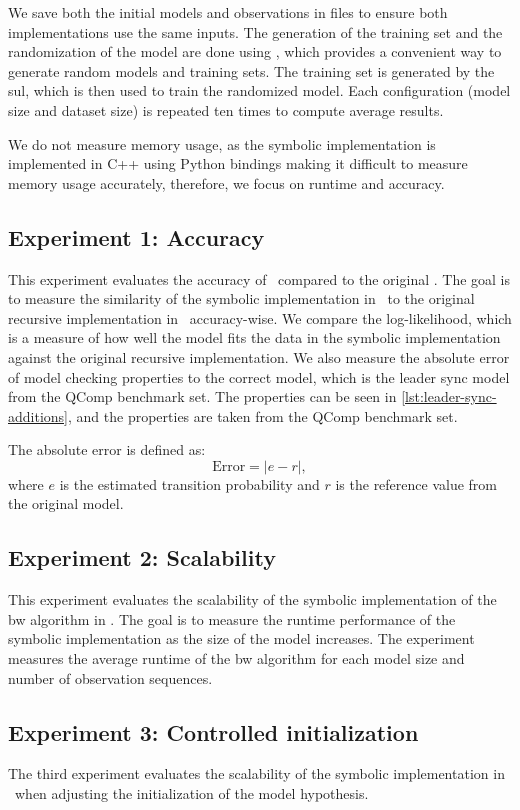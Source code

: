 We save both the initial models and observations in files to ensure both implementations use the same inputs.
The generation of the training set and the randomization of the model are done using \Jajapy, which provides a convenient way to generate random models and training sets.
The training set is generated by the \gls{sul}, which is then used to train the randomized model.
Each configuration (model size and dataset size) is repeated ten times to compute average results.

We do not measure memory usage, as the symbolic implementation is implemented in C++ using Python bindings making it difficult to measure memory usage accurately, therefore, we focus on runtime and accuracy.


\subsection{Experiment 1: Accuracy}\label{sec:exp_accuracy}
This experiment evaluates the accuracy of \JajapyTwo\ compared to the original \Jajapy.
The goal is to measure the similarity of the symbolic implementation in \JajapyTwo\ to the original recursive implementation in \Jajapy\ accuracy-wise.
We compare the log-likelihood, which is a measure of how well the model fits the data in the symbolic implementation against the original recursive implementation.
We also measure the absolute error of model checking properties to the correct model, which is the leader sync model from the QComp benchmark set.
The properties can be seen in \autoref{lst:leader-sync-additions}, and the properties are taken from the QComp benchmark set.

The absolute error is defined as:
\[
    \text{Error} = |e - r|,
\]
where $e$ is the estimated transition probability and $r$ is the reference value from the original model.

\subsection{Experiment 2: Scalability}\label{sec:exp_scalability}
This experiment evaluates the scalability of the symbolic implementation of the \gls{bw} algorithm in \JajapyTwo.
The goal is to measure the runtime performance of the symbolic implementation as the size of the model increases.
The experiment measures the average runtime of the \gls{bw} algorithm for each model size and number of observation sequences.

\subsection{Experiment 3: Controlled initialization}\label{sec:exp_extra_scalability}
The third experiment evaluates the scalability of the symbolic implementation in \JajapyTwo\ when adjusting the initialization of the model hypothesis.

